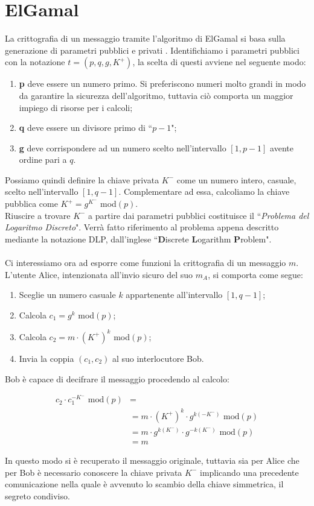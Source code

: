 \documentclass[a4paper,12pt]{tesiinfo}
\begin{document}
\section{ElGamal}
La crittografia di un messaggio tramite l'algoritmo di ElGamal si basa sulla generazione di parametri pubblici e privati \cite{guide to ECC}. Identifichiamo i parametri pubblici con la notazione $t = (p, q, g, K^+)$, la scelta di questi avviene nel seguente modo:
\begin{enumerate}
 \item \textbf{p} deve essere un numero primo. Si preferiscono numeri molto grandi in modo da garantire la sicurezza dell'algoritmo, tuttavia ci\`o comporta un maggior impiego di risorse per i calcoli;
 \item \textbf{q} deve essere un divisore primo di ``$p-1$";
 \item \textbf{g} deve corrispondere ad un numero scelto nell'intervallo $[1, p-1]$ avente ordine pari a $q$.
\end{enumerate}
Possiamo quindi definire la chiave privata $K^-$ come un numero intero, casuale, scelto nell'intervallo $[1, q-1]$. Complementare ad essa, calcoliamo la chiave pubblica come $K^+ = g^{K^-}$ mod$(p)$.
\\
Riuscire a trovare $K^-$ a partire dai parametri pubblici costituisce il ``\textit{Problema del Logaritmo Discreto}". Verr\`a fatto riferimento al problema appena descritto mediante la notazione DLP, dall'inglese ``\textbf{D}iscrete \textbf{L}ogarithm \textbf{P}roblem". 
\\
\\
Ci interessiamo ora ad esporre come funzioni la crittografia di un messaggio $m$. L'utente Alice, intenzionata all'invio sicuro del suo $m_A$, si comporta come segue:
\begin{enumerate}
 \item Sceglie un numero casuale $k$ appartenente all'intervallo $[1, q-1]$;
 \item Calcola $c_1 = g^k$ mod$(p)$;
 \item Calcola $c_2 = m \cdot (K^+)^k$ mod$(p)$;
 \item Invia la coppia $(c_1, c_2)$ al suo interlocutore Bob. 
\end{enumerate}
Bob \`e capace di decifrare il messaggio procedendo al calcolo:
\begin{center}
\begin{align*}
c_2 \cdot c_1^{-K^-} \text{ mod}(p) &=\\
 &= m \cdot (K^+)^k \cdot g^{k  (-K^-)} \text{ mod}(p)\\
 &= m \cdot g^{k  (K^-)} \cdot g^{-k (K^-)} \text{ mod}(p)\\
 &=m
\end{align*}
\end{center}
In questo modo si \`e recuperato il messaggio originale, tuttavia sia per Alice che per Bob \`e necessario conoscere la chiave privata $K^-$ implicando una precedente comunicazione nella quale \`e avvenuto lo scambio della chiave simmetrica, il segreto condiviso.
%
%
%
%
%
%
%
%
\end{document}
